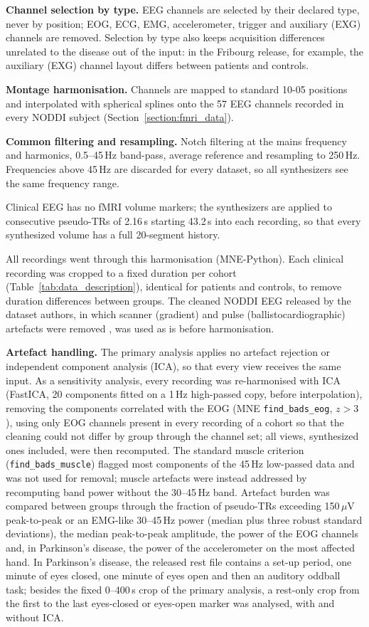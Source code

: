 \documentclass[pdflatex,referee,sn-basic]{sn-jnl}%
\begin{document}
\noindent\textbf{Channel selection by type.} EEG channels are selected by their declared type, never by position; EOG, ECG, EMG, accelerometer, trigger and auxiliary (EXG) channels are removed. Selection by type also keeps acquisition differences unrelated to the disease out of the input: in the Fribourg release, for example, the auxiliary (EXG) channel layout differs between patients and controls.

\noindent\textbf{Montage harmonisation.} Channels are mapped to standard 10-05 positions and interpolated with spherical splines onto the 57 EEG channels recorded in every NODDI subject (Section~\ref{section:fmri_data}).

\noindent\textbf{Common filtering and resampling.} Notch filtering at the mains frequency and harmonics, 0.5--45\,Hz band-pass, average reference and resampling to 250\,Hz. Frequencies above 45\,Hz are discarded for every dataset, so all synthesizers see the same frequency range.

Clinical EEG has no fMRI volume markers; the synthesizers are applied to consecutive pseudo-TRs of 2.16\,s starting 43.2\,s into each recording, so that every synthesized volume has a full 20-segment history.

All recordings went through this harmonisation (MNE-Python). Each clinical recording was cropped to a fixed duration per cohort (Table~\ref{tab:data_description}), identical for patients and controls, to remove duration differences between groups. The cleaned NODDI EEG released by the dataset authors, in which scanner (gradient) and pulse (ballistocardiographic) artefacts were removed \cite{dataset_01}, was used as is before harmonisation.

\noindent\textbf{Artefact handling.} The primary analysis applies no artefact rejection or independent component analysis (ICA), so that every view receives the same input. As a sensitivity analysis, every recording was re-harmonised with ICA (FastICA, 20 components fitted on a 1\,Hz high-passed copy, before interpolation), removing the components correlated with the EOG (MNE \texttt{find\_bads\_eog}, $z>3$), using only EOG channels present in every recording of a cohort so that the cleaning could not differ by group through the channel set; all views, synthesized ones included, were then recomputed. The standard muscle criterion (\texttt{find\_bads\_muscle}) flagged most components of the 45\,Hz low-passed data and was not used for removal; muscle artefacts were instead addressed by recomputing band power without the 30--45\,Hz band. Artefact burden was compared between groups through the fraction of pseudo-TRs exceeding 150\,$\mu$V peak-to-peak or an EMG-like 30--45\,Hz power (median plus three robust standard deviations), the median peak-to-peak amplitude, the power of the EOG channels and, in Parkinson's disease, the power of the accelerometer on the most affected hand. In Parkinson's disease, the released rest file contains a set-up period, one minute of eyes closed, one minute of eyes open and then an auditory oddball task; besides the fixed 0--400\,s crop of the primary analysis, a rest-only crop from the first to the last eyes-closed or eyes-open marker was analysed, with and without ICA.
\end{document}
